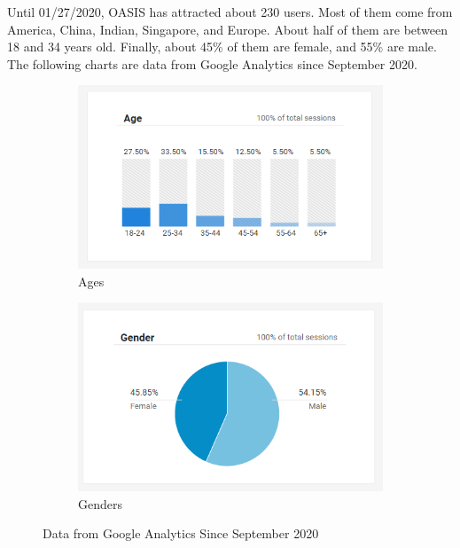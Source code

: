 \documentclass{ucsdreport}
\begin{document}
Until 01/27/2020, OASIS has attracted about 230 users. Most of them come from 
America, China, Indian, Singapore, and Europe. About half of them are between 
18 and 34 years old. Finally, about 45\% of them are female, and 55\% are
male. The following charts are data from Google Analytics since September 2020.


\begin{figure}[H]
	\centering
	\begin{subfigure}{.49\textwidth}
		\includegraphics[scale = 0.75]{images/age.PNG}
		\caption{Ages}
	\end{subfigure}
	\begin{subfigure}{.49\textwidth}
		\includegraphics[scale = 0.75]{images/geneder.PNG}
		\caption{Genders}
	\end{subfigure}
	\caption{Data from Google Analytics Since September 2020}
\end{figure}


\newpage
\end{document}
